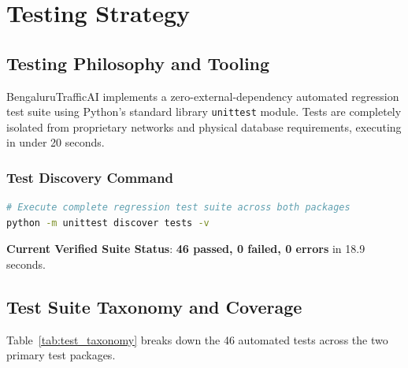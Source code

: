 \chapter{Testing Strategy}

\section{Testing Philosophy and Tooling}
BengaluruTrafficAI implements a zero-external-dependency automated regression test suite using Python's standard library \texttt{unittest} module. Tests are completely isolated from proprietary networks and physical database requirements, executing in under 20 seconds.

\subsection{Test Discovery Command}
\begin{lstlisting}[language=bash]
# Execute complete regression test suite across both packages
python -m unittest discover tests -v
\end{lstlisting}
\textbf{Current Verified Suite Status}: \textbf{46 passed, 0 failed, 0 errors} in 18.9 seconds.

\section{Test Suite Taxonomy and Coverage}
Table~\ref{tab:test_taxonomy} breaks down the 46 automated tests across the two primary test packages.

